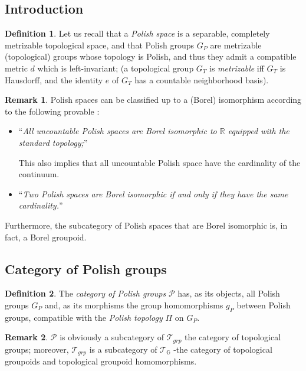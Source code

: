 \documentclass[12pt]{article}
\theoremstyle{plain}
\theoremstyle{definition}
\newtheorem{definition}{Definition}[section]
\newtheorem{remark}{Remark}[section]
\numberwithin{equation}{section}
\newcommand{\grp}{{\mathbb G}}
\begin{document}
\subsection{Introduction}
\begin{definition}
 Let us recall that a \emph{Polish space} is a separable, completely metrizable topological space, and
that Polish groups $G_P$ are metrizable (topological) groups whose topology is Polish, and thus they admit a compatible metric $d$ which is left-invariant; (a topological group $G_T$ is \emph{metrizable} iff $G_T$ is Hausdorff, and the identity $e$ of $G_T$ has a countable neighborhood basis). 
\end{definition}

\begin{remark}

 Polish spaces can be classified up to a (Borel) isomorphism according to the following provable 
:

\begin{itemize} 
\item ``{\em All uncountable Polish spaces are Borel isomorphic to $\mathbb{R}$ equipped with the standard topology;}''
  
 This also implies that all uncountable Polish space have the cardinality of the continuum.

\item ``{\em Two Polish spaces are Borel isomorphic if and only if they have the same cardinality.}''

\end{itemize}

 Furthermore, the subcategory of Polish spaces that are Borel isomorphic is, in fact, a Borel groupoid. 
\end{remark}


\subsection{Category of Polish groups}
\begin{definition}
 The \emph{category of Polish groups} $\mathcal{P}$ has, as its objects, all Polish groups $G_P$ and, as its morphisms
the group homomorphisms $g_P$ between Polish groups, compatible with the \emph{Polish topology} \textbf{$\Pi$} on $G_P$.
\end{definition} 

\begin{remark}
$\mathcal{P}$ is obviously a subcategory of $\mathcal{T}_{grp}$ the category of topological groups; moreover,
$\mathcal{T}_{grp}$ is a subcategory of $\mathcal{T}_{\grp}$ -the category of topological groupoids and topological groupoid homomorphisms.
\end{remark} 

 

\end{document}
